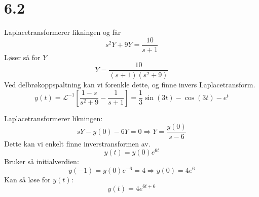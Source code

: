 \documentclass[11pt, a4paper, norsk]{NTNUoving}
\begin{document}
\section*{6.2}
\begin{oppgave}[4]
  Laplacetransformerer likningen og får
  \[
    s^{2}Y+9Y=\frac{10}{s+1}
  \]
  Løser så for $Y$
  \[
    Y = \frac{10}{(s+1)(s^{2}+9)}
  \]
  Ved delbrøkoppspaltning kan vi forenkle dette, og finne invers Laplacetransform.
  \[
    y(t)= \mathscr{L}^{-1}\left[\frac{1-s}{s^{2}+9}-\frac{1}{s+1}\right]
        = \frac{1}{3}\sin(3t)-\cos(3t)-e^{t}
  \]
\end{oppgave}
\begin{oppgave}[13]
  Laplacetransformerer likningen:
  \[
    sY-y(0)-6Y=0\Rightarrow Y=\frac{y(0)}{s-6}
  \]
  Dette kan vi enkelt finne inverstransformen av.
  \[
    y(t)=y(0)e^{6t}
  \]
  Bruker så initialverdien:
  \[
    y(-1)=y(0)e^{-6}=4\Rightarrow y(0)=4e^{6}
  \]
  Kan så løse for $y(t)$:
  \[
    y(t)=4e^{6t+6}
  \]
\end{oppgave}
\newpage
\end{document}
